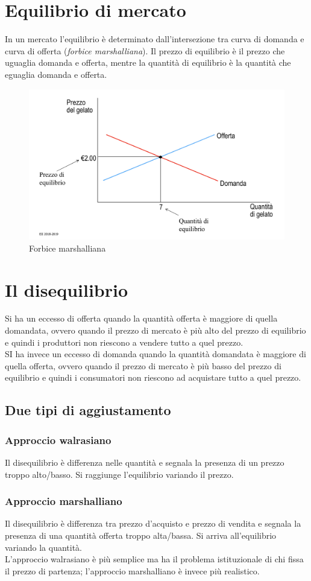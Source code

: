 \documentclass{report}
\begin{document}
	\section{Equilibrio di mercato}
	In un mercato l'equilibrio è determinato dall'intersezione tra curva di domanda e curva di offerta (\textit{forbice marshalliana}). Il prezzo di equilibrio è il prezzo che uguaglia domanda e offerta, mentre la quantità di equilibrio è la quantità che eguaglia domanda e offerta.
	\begin{figure}[h]
		\centering
		\includegraphics[width=0.7\linewidth]{forbice-marshalliana}
		\caption[Forbice marshalliana]{Forbice marshalliana}
		\label{fig:forbice-marshalliana}
	\end{figure}
	\section{Il disequilibrio}
	Si ha un eccesso di offerta quando la quantità offerta è maggiore di quella domandata, ovvero quando il prezzo di mercato è più alto del prezzo di equilibrio e quindi i produttori non riescono a vendere tutto a quel prezzo.
	\medskip \\
	SI ha invece un eccesso di domanda quando la quantità domandata è maggiore di quella offerta, ovvero quando il prezzo di mercato è più basso del prezzo di equilibrio e quindi i consumatori non riescono ad acquistare tutto a quel prezzo.
	\subsection{Due tipi di aggiustamento}
	\subsubsection{Approccio walrasiano}
	Il disequilibrio è differenza nelle quantità e segnala la presenza di un prezzo troppo alto/basso. Si raggiunge l'equilibrio variando il prezzo.
	\subsubsection{Approccio marshalliano}
	Il disequilibrio è differenza tra prezzo d'acquisto e prezzo di vendita e segnala la presenza di una quantità offerta troppo alta/bassa. Si arriva all'equilibrio variando la quantità.
	\medskip \\L'approccio walrasiano è più semplice ma ha il problema istituzionale di chi fissa il prezzo di partenza; l'approccio marshalliano è invece più realistico.
\end{document}
